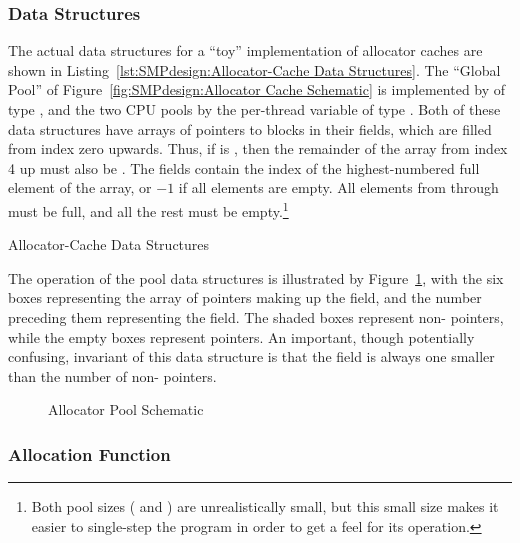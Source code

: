 \subsubsection{Data Structures}

The actual data structures for a ``toy'' implementation of allocator
caches are shown in
Listing~\ref{lst:SMPdesign:Allocator-Cache Data Structures}.
The ``Global Pool'' of Figure~\ref{fig:SMPdesign:Allocator Cache Schematic}
is implemented by  of type ,
and the two CPU pools by the per-thread variable  of
type .
Both of these data structures have arrays of pointers to blocks
in their  fields, which are filled from index zero upwards.
Thus, if  is , then the remainder of
the array from index 4 up must also be .
The  fields contain the index of the highest-numbered full
element of the  array, or $-1$ if all elements are empty.
All elements from  through
 must be full, and all the rest
must be empty.\footnote{
	Both pool sizes ( and
	) are unrealistically small, but this small
	size makes it easier to single-step the program in order to get
	a feel for its operation.}

\begin{listing}[tbp]

\caption{Allocator-Cache Data Structures}
\label{lst:SMPdesign:Allocator-Cache Data Structures}
\end{listing}

The operation of the pool data structures is illustrated by
Figure~\ref{fig:SMPdesign:Allocator Pool Schematic},
with the six boxes representing the array of pointers making up
the  field, and the number preceding them representing
the  field.
The shaded boxes represent non- pointers, while the empty
boxes represent  pointers.
An important, though potentially confusing, invariant of this
data structure is that the  field is always one
smaller than the number of non- pointers.

\begin{figure}[tbp]
\centering
{}
\caption{Allocator Pool Schematic}
\label{fig:SMPdesign:Allocator Pool Schematic}
\end{figure}

\subsubsection{Allocation Function}

